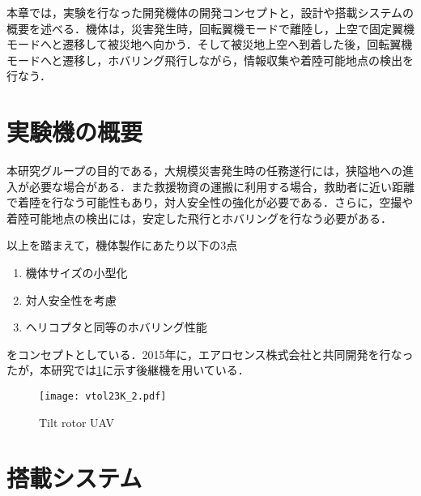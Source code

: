 本章では，実験を行なった開発機体の開発コンセプトと，設計や搭載システムの概要を述べる．機体は，災害発生時，回転翼機モードで離陸し，上空で固定翼機モードへと遷移して被災地へ向かう．そして被災地上空へ到着した後，回転翼機モードへと遷移し，ホバリング飛行しながら，情報収集や着陸可能地点の検出を行なう．

\section{実験機の概要}
本研究グループの目的である，大規模災害発生時の任務遂行には，狭隘地への進入が必要な場合がある．また救援物資の運搬に利用する場合，救助者に近い距離で着陸を行なう可能性もあり，対人安全性の強化が必要である．さらに，空撮や着陸可能地点の検出には，安定した飛行とホバリングを行なう必要がある．

以上を踏まえて，機体製作にあたり以下の3点
	\begin{enumerate}
	\item 機体サイズの小型化
	\item 対人安全性を考慮
	\item ヘリコプタと同等のホバリング性能
	\end{enumerate}
をコンセプトとしている．2015年に，エアロセンス株式会社と共同開発を行なったが，本研究では\ref{fig:vtol23k}に示す後継機を用いている．

\begin{figure}[H]
\centering
\texttt{[image: vtol23K\_2.pdf]}
\caption{Tilt rotor UAV}
\label{fig:vtol23k}
\end{figure}


\section{搭載システム}
